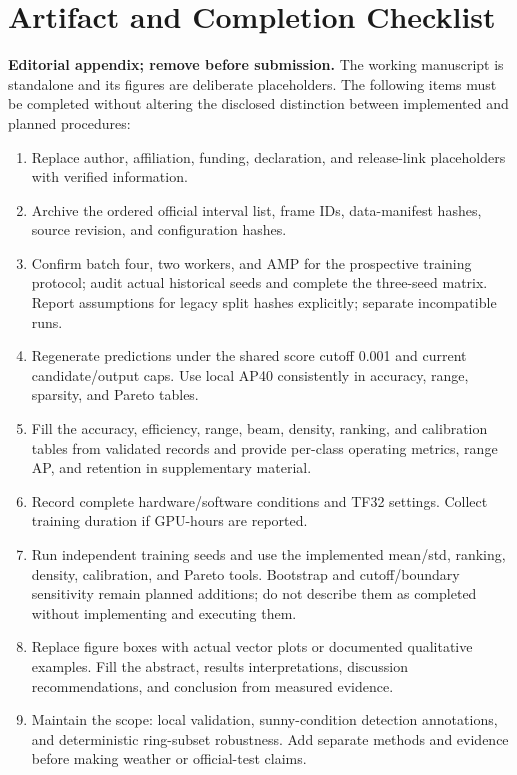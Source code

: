 \documentclass[10pt,twocolumn]{article}
\begin{document}
\section{Artifact and Completion Checklist}
\label{app:checklist}
\textbf{Editorial appendix; remove before submission.} The working manuscript is standalone and its figures are deliberate placeholders. The following items must be completed without altering the disclosed distinction between implemented and planned procedures:
\begin{enumerate}
\item Replace author, affiliation, funding, declaration, and release-link placeholders with verified information.
\item Archive the ordered official interval list, frame IDs, data-manifest hashes, source revision, and configuration hashes.
\item Confirm batch four, two workers, and AMP for the prospective training protocol; audit actual historical seeds and complete the three-seed matrix. Report assumptions for legacy split hashes explicitly; separate incompatible runs.
\item Regenerate predictions under the shared score cutoff 0.001 and current candidate/output caps. Use local AP40 consistently in accuracy, range, sparsity, and Pareto tables.
\item Fill the accuracy, efficiency, range, beam, density, ranking, and calibration tables from validated records and provide per-class operating metrics, range AP, and retention in supplementary material.
\item Record complete hardware/software conditions and TF32 settings. Collect training duration if GPU-hours are reported.
\item Run independent training seeds and use the implemented mean/std, ranking, density, calibration, and Pareto tools. Bootstrap and cutoff/boundary sensitivity remain planned additions; do not describe them as completed without implementing and executing them.
\item Replace figure boxes with actual vector plots or documented qualitative examples. Fill the abstract, results interpretations, discussion recommendations, and conclusion from measured evidence.
\item Maintain the scope: local validation, sunny-condition detection annotations, and deterministic ring-subset robustness. Add separate methods and evidence before making weather or official-test claims.
\end{enumerate}
\end{document}
